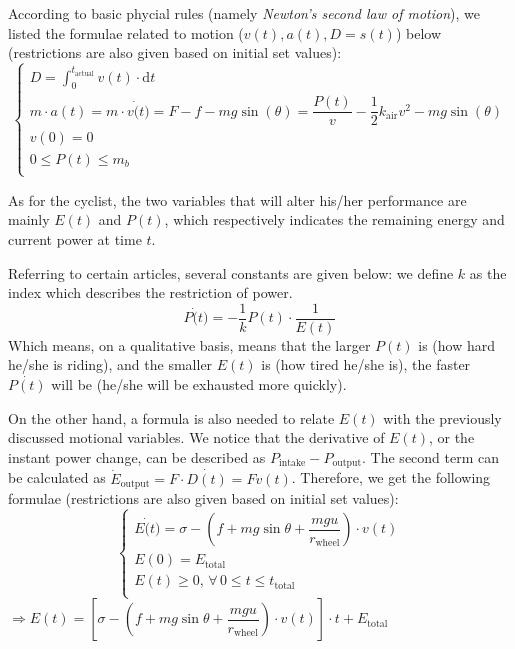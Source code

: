 \documentclass{article}
\begin{document}
\begin{itemize}
					According to basic phycial rules (namely \textit{Newton's second law of motion}), we listed the formulae related to motion (\(v\left( t \right) ,a\left( t \right) ,D=s\left( t \right) \)) below (restrictions are also given based on initial set values):
					$$
					\begin{cases}
						\displaystyle
						D=\int^{t_\mathrm{actual}}_0 v(t)\cdot \mathrm{d}t\\
						m \cdot  a (t)=m \cdot v\dot(t)=F-f-mg\sin\left(\theta\right)=\dfrac{P (t)}{v}-\dfrac{1}{2} k_{\mathrm{air}} v^2-mg\sin\left(\theta\right)\\
						v(0)=0\\
						0\leq P (t)\leq m_ b\\
					\end{cases}
					$$

					As for the cyclist, the two variables that will alter his/her performance are mainly \(E(t)\) and \(P(t)\), which respectively indicates the remaining energy and current power at time \(t\).

					Referring to certain articles\cite{114514}, several constants are given below: we define $k$ as the index which describes the restriction of power.
					\[P \dot(t)=-\dfrac{1}{ k } P (t) \cdot \dfrac{1}{ E (t)}\]
					Which means, on a qualitative basis, means that the larger \(P(t)\) is (how hard he/she is riding), and the smaller \(E(t)\) is (how tired he/she is), the faster \(\dot{P(t)}\) will be (he/she will be exhausted more quickly).

					On the other hand, a formula is also needed to relate \(E(t)\) with the previously discussed motional variables. We notice that the derivative of \(E(t)\), or the instant power change, can be described as \(P_{\mathrm{intake}} - P_{\mathrm{output}}\). The second term can be calculated as \(\dot{E}_{\mathrm{output}}=F\cdot \dot{D\left( t \right)} =Fv\left( t \right) \). Therefore, we get the following formulae (restrictions are also given based on initial set values):
					$$
					\begin{cases}
						\displaystyle
						E \dot(t)=\sigma-\left(f+mg\sin\theta+\dfrac{mgu}{r_{\mathrm{wheel}}}\right)\cdot v(t) \\
						E (0)= E _\mathrm{total} \\
						E (t)\geq0,\, \forall\,0 \leq t \leq t_\mathrm{total} \\
					\end{cases}
					$$
					\(\Rightarrow E (t)=\left[\sigma-\left(f+mg\sin \theta +\dfrac{mgu}{r_{\mathrm{wheel}}} \right)\cdot v(t)\right]\cdot t+ E _\mathrm{total}\)


\end{itemize}
\end{document}
